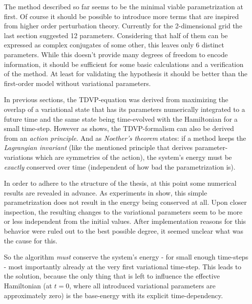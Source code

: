 The method described so far seems to be the minimal viable parametrization at first.
Of course it should be possible to introduce more terms that are inspired from higher order perturbation theory.
Currently for the 2-dimensional grid the last section suggested 12 parameters. 
Considering that half of them can be expressed as complex conjugates of some other, this leaves only 6 distinct parameters.
While this doesn't provide many degrees of freedom to encode information, it should be sufficient for some basic calculations and a verification of the method.
At least for validating the hypothesis it should be better than the first-order model without variational parameters.

In previous sections, the TDVP-equation was derived from maximizing the overlap of a variational state that has its parameters numerically integrated to a future time and the same state being time-evolved with the Hamiltonian for a small time-step.
However as \cite{TDVPfromActionPrinciple} shows, the TDVP-formalism can also be derived from an \emph{action principle}.
And as \emph{Noether's theorem} states: if a method keeps the \emph{Lagrangian invariant} (like the mentioned principle that derives parameter-variations which are symmetries of the action), the system's energy must be \emph{exactly} conserved over time \cite{energyConservationFromActionPrinciple} (independent of how \glqq bad\grqq{} the parametrization is).

In order to adhere to the structure of the thesis, at this point some numerical results are revealed in advance. 
As experiments in  show, this simple parametrization does not result in the energy being conserved at all.
Upon closer inspection, the resulting changes to the variational parameters seem to be more or less independent from the initial values.
After implementation reasons for this behavior were ruled out to the best possible degree, it seemed unclear what was the cause for this.

So the algorithm \emph{must} conserve the system's energy - for small enough time-steps - most importantly already at the very first variational time-step.
This leads to the solution, because the only thing that is left to influence the effective Hamiltonian (at $t=0$, where all introduced variational parameters are approximately zero) is the base-energy with its explicit time-dependency.

